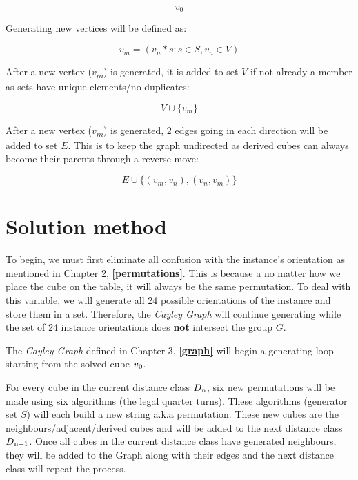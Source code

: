 \documentclass[a4paper]{article}
\begin{document}
\[v_0\]

\par Generating new vertices will be defined as:

\[v_m = (v_n * s : s\in S, v_n\in V)\]

\par After a new vertex ($v$\textsubscript{$m$}) is generated, it is added to set $V$ if not already a member as sets have unique elements/no duplicates:

\[V\cup \{v_m\}\]

\par After a new vertex ($v$\textsubscript{$m$}) is generated, 2 edges going in each direction will be added to set $E$. This is to keep the graph undirected as derived cubes can always become their parents through a reverse move:

\[E\cup \{(v_m,v_n),(v_n,v_m)\}\]

\section{Solution method}
\par To begin, we must first eliminate all confusion with the instance's orientation as mentioned in Chapter 2, \textbf{\autoref{permutations}}. This is because a no matter how we place the cube on the table, it will always be the same permutation. To deal with this variable, we will generate all 24 possible orientations of the instance and store them in a set. Therefore, the \emph{Cayley Graph} will continue generating while the set of 24 instance orientations does \textbf{not} intersect the group $G$. 

\par The \emph{Cayley Graph} defined in Chapter 3, \textbf{\autoref{graph}} will begin a generating loop starting from the solved cube $v\textsubscript{0}$.

\par For every cube in the current distance class $D\textsubscript{n}$, six new permutations will be made using six algorithms (the legal quarter turns). These algorithms (generator set $S$) will each build a new string a.k.a permutation. These new cubes are the neighbours/adjacent/derived cubes and will be added to the next distance class $D\textsubscript{n+1}$. Once all cubes in the current distance class have generated neighbours, they will be added to the Graph along with their edges and the next distance class will repeat the process.
\end{document}
